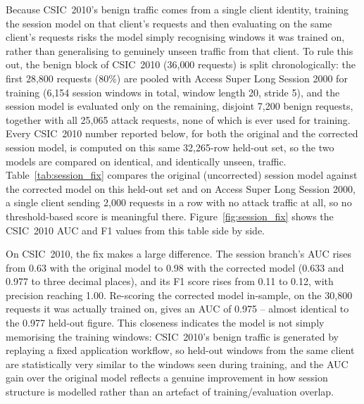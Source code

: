 \documentclass[futureinternet,article,submit,moreauthors]{Definitions/mdpi}
\begin{document}
Because CSIC~2010's benign traffic comes from a single client identity, training the session model on that client's requests and then evaluating on the same client's requests risks the model simply recognising windows it was trained on, rather than generalising to genuinely unseen traffic from that client. To rule this out, the benign block of CSIC~2010 (36{,}000 requests) is split chronologically: the first 28{,}800 requests (80\%) are pooled with Access Super Long Session 2000 for training (6{,}154 session windows in total, window length 20, stride 5), and the session model is evaluated only on the remaining, disjoint 7{,}200 benign requests, together with all 25{,}065 attack requests, none of which is ever used for training. Every CSIC~2010 number reported below, for both the original and the corrected session model, is computed on this same 32{,}265-row held-out set, so the two models are compared on identical, and identically unseen, traffic. Table~\ref{tab:session_fix} compares the original (uncorrected) session model against the corrected model on this held-out set and on Access Super Long Session 2000, a single client sending 2{,}000 requests in a row with no attack traffic at all, so no threshold-based score is meaningful there. Figure~\ref{fig:session_fix} shows the CSIC~2010 AUC and F1 values from this table side by side.

On CSIC~2010, the fix makes a large difference. The session branch's AUC rises from 0.63 with the original model to 0.98 with the corrected model (0.633 and 0.977 to three decimal places), and its F1 score rises from 0.11 to 0.12, with precision reaching 1.00. Re-scoring the corrected model in-sample, on the 30{,}800 requests it was actually trained on, gives an AUC of 0.975 -- almost identical to the 0.977 held-out figure. This closeness indicates the model is not simply memorising the training windows: CSIC~2010's benign traffic is generated by replaying a fixed application workflow, so held-out windows from the same client are statistically very similar to the windows seen during training, and the AUC gain over the original model reflects a genuine improvement in how session structure is modelled rather than an artefact of training/evaluation overlap.
\end{document}
